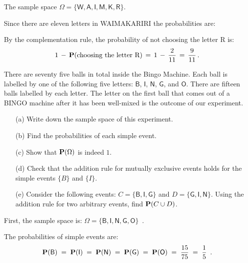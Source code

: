 \begin{ExerciseList}
\be
\item The sample space $\Omega=\{\mathsf{W},\mathsf{A},\mathsf{I},\mathsf{M},\mathsf{K},\mathsf{R}\}$.
\item   Since there are eleven letters in WAIMAKARIRI the probabilities are:

\item By the complementation rule, the probability of not choosing
    the letter R is:  \[1\,-\,\mathbf{P}(\text{choosing the letter R})\,=\,1\,-\, \frac{2}{11}\,=\,\frac{9}{11}\,.\]

\ee


\Exercise
There are seventy five balls in total inside the Bingo Machine.  
Each ball is labelled by one of the following five letters: 
$\mathsf{B}$, $\mathsf{I}$, $\mathsf{N}$, $\mathsf{G}$, and $\mathsf{O}$.  
There are fifteen balls labelled by each letter.  
The letter on the first ball that comes out of a BINGO machine after it has been well-mixed is the outcome of our experiment. 
\begin{itemize}
\item[(a)] Write down the sample space of this experiment.
\item[(b)] Find the probabilities of each simple event.
\item[(c)] Show that $\mathbf{P}(\Omega)$ is indeed $1$.
\item[(d)] Check that the addition rule for mutually exclusive events holds for the simple events $\{B\}$ and $\{I\}$. 
\item[(e)]Consider the following events: 
$C = \{\mathsf{B},\mathsf{I},\mathsf{G}\}$ and $D = \{\mathsf{G},\mathsf{I},\mathsf{N}\}$.  
Using the addition rule for two arbitrary events, find  $\mathbf{P}(C \cup D)$.
\end{itemize}

\Answer
\be
\item
First, the sample space is: $\Omega=\{ {\mathsf{B}, \mathsf{I},
  \mathsf{N}, \mathsf{G}, \mathsf{O} } \} \enspace . $
\medskip

\item The probabilities of simple events are:
$$
\mathbf{P}(\mathsf{B} )\;=\;\mathbf{P}(\mathsf{I})\;=\;\mathbf{P}(\mathsf{N})\;=\;\mathbf{P}(\mathsf{G})\;=\;\mathbf{P}(\mathsf{O})\;=\;{\frac{15}{75}\;=\;\frac{1}{5}} \enspace .
$$

\item 


\end{ExerciseList}
